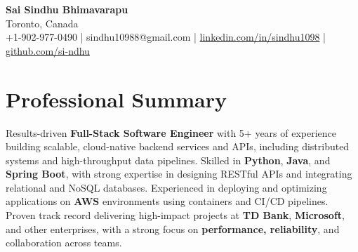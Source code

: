 \documentclass[letterpaper,11pt]{article}
\begin{document}
\begin{center}
  {\Large \textbf{Sai Sindhu Bhimavarapu}} \\
  Toronto, Canada \\
  +1-902-977-0490 \enspace | \enspace sindhu10988@gmail.com \enspace | \enspace \href{https://www.linkedin.com/in/sindhu1098/}{linkedin.com/in/sindhu1098} \enspace | \enspace \href{https://github.com/si-ndhu}{github.com/si-ndhu}
\end{center}

\section{Professional Summary}
  \begin{itemize}[leftmargin=0.15in, label={}]
    \small{\item{
     Results-driven \textbf{Full-Stack Software Engineer} with 5+ years of experience building scalable, cloud-native backend services and APIs, including distributed systems and high-throughput data pipelines. Skilled in \textbf{Python}, \textbf{Java}, and \textbf{Spring Boot}, with strong expertise in designing RESTful APIs and integrating relational and NoSQL databases. Experienced in deploying and optimizing applications on \textbf{AWS} environments using containers and CI/CD pipelines. Proven track record delivering high-impact projects at \textbf{TD Bank}, \textbf{Microsoft}, and other enterprises, with a strong focus on \textbf{performance, reliability}, and collaboration across teams.
    }}
  \end{itemize}
\vspace{-16pt}

\end{document}
